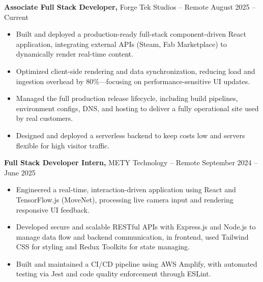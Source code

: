 \documentclass[11pt]{article}       %
\begin{document}
\textbf{Associate Full Stack Developer,} {Forge Tek Studios} -- Remote \hfill August 2025 -- Current 
\vspace{-9pt}
\begin{itemize}
  \item Built and deployed a production-ready full-stack component-driven React application, integrating external APIs (Steam, Fab Marketplace) to dynamically render real-time content.
  \item Optimized client-side rendering and data synchronization, reducing load and ingestion overhead by 80\%—focusing on performance-sensitive UI updates.
  \item Managed the full production release lifecycle, including build pipelines, environment configs, DNS, and hosting to deliver a fully operational site used by real customers.
  \item Designed and deployed a serverless backend to keep costs low and servers flexible for high visitor traffic.
\end{itemize}

\textbf{Full Stack Developer Intern,} {METY Technology} -- Remote \hfill September 2024 -- June 2025 
\vspace{-9pt}
\begin{itemize}
  \item Engineered a real-time, interaction-driven application using React and TensorFlow.js (MoveNet), processing live camera input and rendering responsive UI feedback.
  \item Developed secure and scalable RESTful APIs with Express.js and Node.js to manage data flow and backend communication, in frontend, used Tailwind CSS for styling and Redux Toolkits for state managing.
  \item Built and maintained a CI/CD pipeline using AWS Amplify, with automated testing via Jest and code quality enforcement through ESLint.
\end{itemize}

\end{document}

